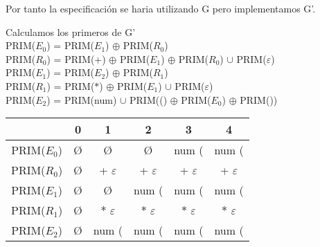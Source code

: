 \documentclass[\main/ApuntesPL.tex]{subfiles}
\begin{document}
      \bigskip
      \par
      Por tanto la especificación se haria utilizando G pero implementamos G'.

      \bigskip
      \par
      Calculamos los primeros de G'\\
      \hspace{5mm}PRIM($E_0$) = PRIM($E_1$) $\oplus$ PRIM($R_0$)\\
      \hspace{5mm}PRIM($R_0$) = PRIM(+) $\oplus$ PRIM($E_1$) $\oplus$ PRIM($R_0$) $\cup$
        PRIM($\varepsilon$)\\
      \hspace{5mm}PRIM($E_1$) = PRIM($E_2$) $\oplus$ PRIM($R_1$)\\
      \hspace{5mm}PRIM($R_1$) = PRIM($\ast$) $\oplus$ PRIM($E_1$) $\cup$ PRIM($\varepsilon$)\\
      \hspace{5mm}PRIM($E_2$) = PRIM(num) $\cup$ PRIM(() $\oplus$ PRIM($E_0$) $\oplus$ PRIM())\\
      \begin{center}
        \begin{tabular}{||c c c c c c||}
          \hline
          & 0 & 1 & 2 & 3 & 4 \\ [0.5ex]
          \hline\hline
          PRIM($E_0$) & \O & \O & \O & num ( & num (\\
          \hline
          PRIM($R_0$) & \O & + $\varepsilon$ & + $\varepsilon$ & + $\varepsilon$ & +
            $\varepsilon$\\
          \hline
          PRIM($E_1$) & \O & \O & num ( & num ( & num (\\
          \hline
          PRIM($R_1$) & \O & $\ast$ $\varepsilon$ & $\ast$ $\varepsilon$ & $\ast$
            $\varepsilon$ & $\ast$ $\varepsilon$\\
          \hline
          PRIM($E_2$) & \O & num ( & num ( & num ( & num (\\ [1ex]
          \hline
        \end{tabular}
      \end{center}
\end{document}
